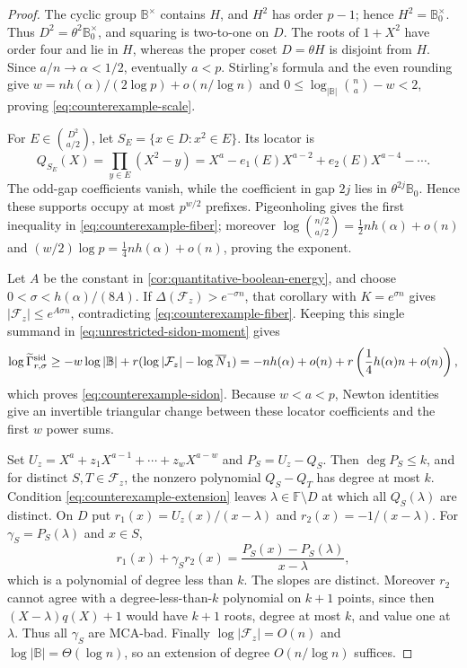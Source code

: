 \documentclass[11pt,a4paper]{amsart}
\numberwithin{equation}{section}
\theoremstyle{remark}
\newcommand{\F}{\mathbb F}
\newcommand{\B}{\mathbb B}
\newcommand{\Gsid}{\Gamma^{\rm sid}}
\newcommand{\barN}{\overline N}
\begin{document}
\begin{proof}
The cyclic group \(\B^\times\) contains \(H\), and \(H^2\) has order
\(p-1\); hence \(H^2=\B_0^\times\).  Thus
\(D^2=\theta^2\B_0^\times\), and squaring is two-to-one on \(D\).  The
roots of \(1+X^2\) have order four and lie in \(H\), whereas the proper
coset \(D=\theta H\) is disjoint from \(H\).  Since
\(a/n\to\alpha<1/2\), eventually \(a<p\).  Stirling's formula and the
even rounding give
\(w=nh(\alpha)/(2\log p)+o(n/\log n)\) and
\(0\le\log_{|\B|}\binom na-w<2\), proving
\eqref{eq:counterexample-scale}.

For \(E\in\binom{D^2}{a/2}\), let
\(S_E=\{x\in D:x^2\in E\}\).  Its locator is
\[
 Q_{S_E}(X)=\prod_{y\in E}(X^2-y)
 =X^a-e_1(E)X^{a-2}+e_2(E)X^{a-4}-\cdots .
\]
The odd-gap coefficients vanish, while the coefficient in gap \(2j\)
lies in \(\theta^{2j}\B_0\).  Hence these supports occupy at most
\(p^{w/2}\) prefixes.  Pigeonholing gives the first inequality in
\eqref{eq:counterexample-fiber}; moreover
\(\log\binom{n/2}{a/2}=\tfrac12nh(\alpha)+o(n)\) and
\((w/2)\log p=\tfrac14nh(\alpha)+o(n)\), proving the exponent.

Let \(A\) be the constant in
\cref{cor:quantitative-boolean-energy}, and choose
\(0<\sigma<h(\alpha)/(8A)\).  If
\(\Delta(\mathcal F_z)>e^{-\sigma n}\), that corollary with
\(K=e^{\sigma n}\) gives \(|\mathcal F_z|\le e^{A\sigma n}\),
contradicting \eqref{eq:counterexample-fiber}.  Keeping this single
summand in \eqref{eq:unrestricted-sidon-moment} gives
\[
 \log\widetilde\Gsid_{r,\sigma}
 \ge-w\log|\B|+r(\log|\mathcal F_z|-\log\barN_1)
 =-nh(\alpha)+o(n)+r\left(\frac14h(\alpha)n+o(n)\right),
\]
which proves \eqref{eq:counterexample-sidon}.  Because \(w<a<p\),
Newton identities give an invertible triangular change between these
locator coefficients and the first \(w\) power sums.

Set \(U_z=X^a+z_1X^{a-1}+\cdots+z_wX^{a-w}\) and
\(P_S=U_z-Q_S\).  Then \(\deg P_S\le k\), and for distinct
\(S,T\in\mathcal F_z\), the nonzero polynomial \(Q_S-Q_T\) has degree at
most \(k\).  Condition \eqref{eq:counterexample-extension} leaves
\(\lambda\in\F\setminus D\) at which all \(Q_S(\lambda)\) are distinct.
On \(D\) put \(r_1(x)=U_z(x)/(x-\lambda)\) and
\(r_2(x)=-1/(x-\lambda)\).  For
\(\gamma_S=P_S(\lambda)\) and \(x\in S\),
\[
 r_1(x)+\gamma_Sr_2(x)
 =\frac{P_S(x)-P_S(\lambda)}{x-\lambda},
\]
which is a polynomial of degree less than \(k\).  The slopes are distinct.
Moreover \(r_2\) cannot agree with a degree-less-than-\(k\) polynomial
on \(k+1\) points, since then \((X-\lambda)q(X)+1\) would have
\(k+1\) roots, degree at most \(k\), and value one at \(\lambda\).
Thus all \(\gamma_S\) are MCA-bad.  Finally
\(\log|\mathcal F_z|=O(n)\) and \(\log|\B|=\Theta(\log n)\), so an
extension of degree \(O(n/\log n)\) suffices.
\end{proof}
\end{document}
